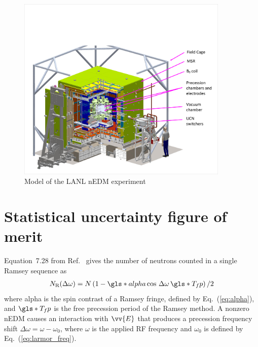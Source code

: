 \begin{figure}
    \centering
    \includegraphics[width=0.9\textwidth]{figures/envisioned_lanl_nedm.pdf}
    \caption{Model of the LANL nEDM experiment}
    \label{fig:envisioned_lanl_nedm}
\end{figure}


\section{Statistical uncertainty figure of merit}\label{sec:figure_of_merit}


Equation~7.28 from Ref.~\cite{golubUCN} gives the number of neutrons counted in a single Ramsey sequence as
%
\begin{gather}
    N_\text{R}(\Delta \omega) = N \left( 1 - \gls*{alpha} \cos \,\Delta \omega \, \gls*{T_fp} \right)/2
\end{gather}
%
where \gls*{alpha} is the spin contrast of a Ramsey fringe, defined by Eq.~(\ref{eq:alpha}), and $\gls*{T_fp}$ is the free precession period of the Ramsey method. A nonzero nEDM causes an interaction with $\vv{E}$ that produces a precession frequency shift $\Delta\omega=\omega-\omega_0$, where $\omega$ is the applied RF frequency and $\omega_0$ is defined by Eq.~(\ref{eq:larmor_freq}). 

